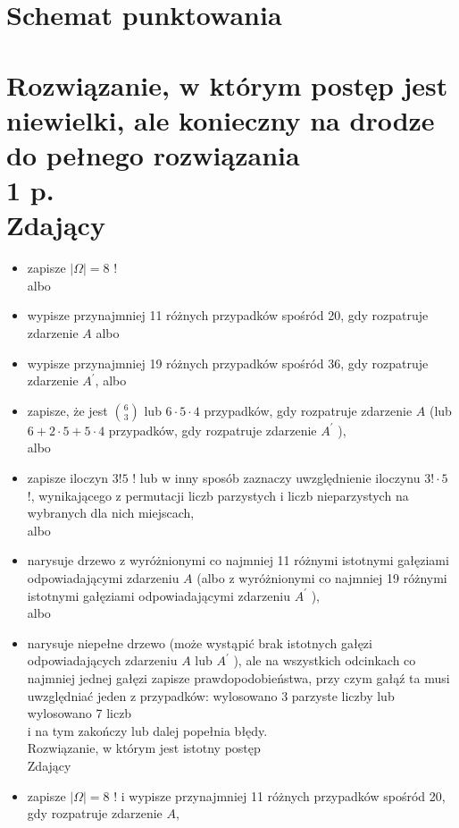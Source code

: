 \documentclass[10pt]{article}
\begin{document}
\section*{Schemat punktowania}
\section*{Rozwiązanie, w którym postęp jest niewielki, ale konieczny na drodze do pełnego rozwiązania \\
 1 p. \\
 Zdający}
\begin{itemize}
  \item zapisze $|\Omega|=8$ !\\
albo
  \item wypisze przynajmniej 11 różnych przypadków spośród 20, gdy rozpatruje zdarzenie $A$ albo
  \item wypisze przynajmniej 19 różnych przypadków spośród 36, gdy rozpatruje zdarzenie $A^{\prime}$, albo
  \item zapisze, że jest $\binom{6}{3}$ lub $6 \cdot 5 \cdot 4$ przypadków, gdy rozpatruje zdarzenie $A$ (lub $6+2 \cdot 5+5 \cdot 4$ przypadków, gdy rozpatruje zdarzenie $A^{\prime}$ ),\\
albo
  \item zapisze iloczyn $3!5$ ! lub w inny sposób zaznaczy uwzględnienie iloczynu $3!\cdot 5$ !, wynikającego z permutacji liczb parzystych i liczb nieparzystych na wybranych dla nich miejscach,\\
albo
  \item narysuje drzewo z wyróżnionymi co najmniej 11 różnymi istotnymi gałęziami odpowiadającymi zdarzeniu $A$ (albo z wyróżnionymi co najmniej 19 różnymi istotnymi gałęziami odpowiadającymi zdarzeniu $A^{\prime}$ ),\\
albo
  \item narysuje niepełne drzewo (może wystąpić brak istotnych gałęzi odpowiadających zdarzeniu $A$ lub $A^{\prime}$ ), ale na wszystkich odcinkach co najmniej jednej gałęzi zapisze prawdopodobieństwa, przy czym gałąź ta musi uwzględniać jeden z przypadków: wylosowano 3 parzyste liczby lub wylosowano 7 liczb\\
i na tym zakończy lub dalej popełnia błędy.\\
Rozwiązanie, w którym jest istotny postęp\\
Zdający
  \item zapisze $|\Omega|=8$ ! i wypisze przynajmniej 11 różnych przypadków spośród 20, gdy rozpatruje zdarzenie $A$,\\

\end{itemize}
\end{document}
